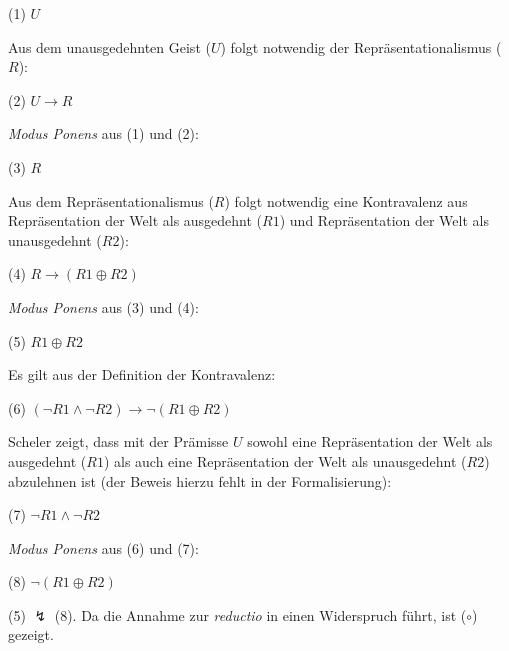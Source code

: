 \documentclass[a4paper, 12pt]{article}
\begin{document}
\vspace{4pt}
(1) \hspace*{1em} $U$

\vspace{4pt}
\noindent Aus dem unausgedehnten Geist ($U$) folgt notwendig der Repräsentationalismus ($R$):  

\vspace{4pt}
(2) \hspace*{1em}  $U \rightarrow R$

\vspace{4pt}
\noindent \emph{Modus Ponens} aus (1) und (2):

\vspace{4pt}
(3) \hspace*{1em} $R$

\vspace{4pt}
\noindent Aus dem Repräsentationalismus ($R$) folgt notwendig eine Kontravalenz aus Repräsentation der Welt als ausgedehnt ($R1$) und Repräsentation der Welt als unausgedehnt ($R2$):

\vspace{4pt}
(4) \hspace*{1em} $R \rightarrow (R1 \oplus R2)$


\vspace{4pt}
\noindent \emph{Modus Ponens} aus (3) und (4):

\vspace{4pt}
(5) \hspace*{1em} $R1 \oplus R2$

\vspace{4pt}

\noindent Es gilt aus der Definition der Kontravalenz: 

\vspace{4pt}
(6) \hspace*{1em}  $(\neg R1 \land \neg R2)  \rightarrow \neg (R1 \oplus R2)$
\vspace{4pt}

\noindent Scheler zeigt, dass mit der Prämisse $U$ sowohl eine Repräsentation der Welt als ausgedehnt ($R1$) als auch eine Repräsentation der Welt als unausgedehnt ($R2$) abzulehnen ist (der Beweis hierzu fehlt in der Formalisierung): 

\vspace{4pt}
(7) \hspace*{1em}  $\neg R1 \land \neg R2$

\vspace{4pt}
\noindent \emph{Modus Ponens} aus (6) und (7):

\vspace{4pt}
(8) \hspace*{1em} $\neg (R1 \oplus R2)$


\vspace{14pt}
\noindent (5) $\lightning$ (8).  Da die Annahme zur \emph{reductio} in einen Widerspruch führt, ist ($\circ$) gezeigt.
\end{document}
